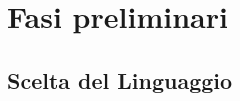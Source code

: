 \section{Fasi preliminari}
\label{sec:preliminary_stages}

\subsection{Scelta del Linguaggio}
\label{sec:linguaggio}